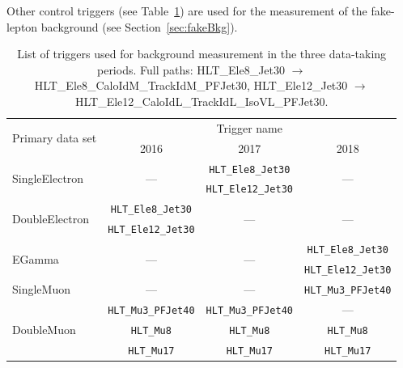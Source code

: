 Other control triggers (see Table~\ref{tab:ctrlTriggers}) are used for
the measurement of the fake-lepton background (see
Section~\ref{sec:fakeBkg}).
\begin{table}[h]
  \begin{center}
     \caption{\label{tab:ctrlTriggers} List of triggers used for
      background measurement in the three data-taking periods. Full paths: HLT\_Ele8\_Jet30 $\rightarrow$ HLT\_Ele8\_CaloIdM\_TrackIdM\_PFJet30, HLT\_Ele12\_Jet30 $\rightarrow$ HLT\_Ele12\_CaloIdL\_TrackIdL\_IsoVL\_PFJet30. }
      \begin{tabular}{|l|c|c|c|}
      \hline
      \multirow{2}{*}{Primary data set} & \multicolumn{3}{|c|}{Trigger name}\\
      \cline{2-4}
      & 2016 & 2017 & 2018 \\
      \hline\hline
      \multirow{2}{*}{SingleElectron} & \multirow{2}{*}{---} & \texttt{\scriptsize HLT\_Ele8\_Jet30} & \multirow{2}{*}{---} \\
      & & \texttt{\scriptsize HLT\_Ele12\_Jet30} & \\
      \hline
      \multirow{2}{*}{DoubleElectron} & \texttt{\scriptsize HLT\_Ele8\_Jet30} & \multirow{2}{*}{---} & \multirow{2}{*}{---} \\
      & \texttt{\scriptsize HLT\_Ele12\_Jet30} & & \\
      \hline
      \multirow{2}{*}{EGamma} & \multirow{2}{*}{---} & \multirow{2}{*}{---} & \texttt{\scriptsize HLT\_Ele8\_Jet30} \\
      & & & \texttt{\scriptsize HLT\_Ele12\_Jet30} \\
      \hline
      SingleMuon     & --- & --- & \texttt{\scriptsize HLT\_Mu3\_PFJet40} \\
      \hline
      \multirow{3}{*}{DoubleMuon} & \texttt{\scriptsize HLT\_Mu3\_PFJet40} & \texttt{\scriptsize HLT\_Mu3\_PFJet40} & --- \\
      & \texttt{\scriptsize HLT\_Mu8} & \texttt{\scriptsize HLT\_Mu8} & \texttt{\scriptsize HLT\_Mu8} \\
      & \texttt{\scriptsize HLT\_Mu17}& \texttt{\scriptsize HLT\_Mu17}& \texttt{\scriptsize HLT\_Mu17}\\
      \hline
    \end{tabular}    
  \end{center}
\end{table}


